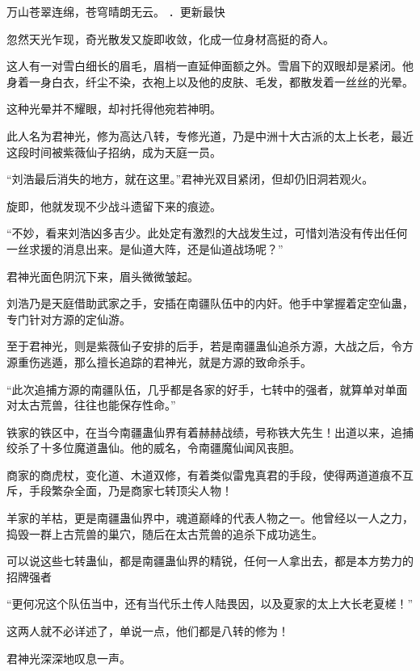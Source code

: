 
\begin{this_body}

万山苍翠连绵，苍穹晴朗无云。 ．更新最快

忽然天光乍现，奇光散发又旋即收敛，化成一位身材高挺的奇人。

这人有一对雪白细长的眉毛，眉梢一直延伸面额之外。雪眉下的双眼却是紧闭。他身着一身白衣，纤尘不染，衣袍上以及他的皮肤、毛发，都散发着一丝丝的光晕。

这种光晕并不耀眼，却衬托得他宛若神明。

此人名为君神光，修为高达八转，专修光道，乃是中洲十大古派的太上长老，最近这段时间被紫薇仙子招纳，成为天庭一员。

“刘浩最后消失的地方，就在这里。”君神光双目紧闭，但却仍旧洞若观火。

旋即，他就发现不少战斗遗留下来的痕迹。

“不妙，看来刘浩凶多吉少。此处定有激烈的大战发生过，可惜刘浩没有传出任何一丝求援的消息出来。是仙道大阵，还是仙道战场呢？”

君神光面色阴沉下来，眉头微微皱起。

刘浩乃是天庭借助武家之手，安插在南疆队伍中的内奸。他手中掌握着定空仙蛊，专门针对方源的定仙游。

至于君神光，则是紫薇仙子安排的后手，若是南疆蛊仙追杀方源，大战之后，令方源重伤逃遁，那么擅长追踪的君神光，就是方源的致命杀手。

“此次追捕方源的南疆队伍，几乎都是各家的好手，七转中的强者，就算单对单面对太古荒兽，往往也能保存性命。”

铁家的铁区中，在当今南疆蛊仙界有着赫赫战绩，号称铁大先生！出道以来，追捕绞杀了十多位魔道蛊仙。他的威名，令南疆魔仙闻风丧胆。

商家的商虎杖，变化道、木道双修，有着类似雷鬼真君的手段，使得两道道痕不互斥，手段繁杂全面，乃是商家七转顶尖人物！

羊家的羊枯，更是南疆蛊仙界中，魂道巅峰的代表人物之一。他曾经以一人之力，捣毁一群上古荒兽的巢穴，随后在太古荒兽的追杀下成功逃生。

可以说这些七转蛊仙，都是南疆蛊仙界的精锐，任何一人拿出去，都是本方势力的招牌强者

“更何况这个队伍当中，还有当代乐土传人陆畏因，以及夏家的太上大长老夏槎！”

这两人就不必详述了，单说一点，他们都是八转的修为！

君神光深深地叹息一声。


\end{this_body}
